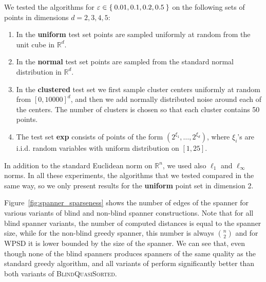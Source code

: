 \documentclass{ws-ijcga}
\newcommand{\eps}{\varepsilon}
\newcommand{\RR}{\mathbb{R}}
\begin{document}

We tested the algorithms for $\eps \in \Set{0.01, 0.1, 0.2, 0.5}$ on the following sets of points in dimensions $d = 2,3,4,5$:
\begin{enumerate}
    \item In the \textbf{uniform} test set points are sampled uniformly at
        random from the unit cube in $\mathbb{R}^d$.
    \item In the \textbf{normal} test set points are sampled from the standard
        normal distribution in $\mathbb{R}^d$.
    \item In the \textbf{clustered} test set we first sample cluster centers uniformly 
        at random from $[0,10000]^d$, and then we add normally distributed noise around
        each of the centers. The number of clusters is chosen so that each cluster
        contains 50 points.
    \item The test set \textbf{exp} consists of points of the form $(2^{\xi_1}, \dots, 2^{\xi_d})$,
        where $\xi_i$'s are i.i.d. random variables with uniform distribution on $[1,25]$.
\end{enumerate}
In addition to the standard Euclidean norm on $\RR^n$, we used also $\ell_1$ and $\ell_\infty$ norms.
In all these experiments, the algorithms that we tested compared in the same way,
so we only present results for the \textbf{uniform} point set in dimension 2.



Figure~\ref{fig:spanner_sparseness}
shows the number of edges of the spanner for various variants of 
blind and non-blind spanner constructions.
Note that for all blind spanner variants, the number of computed distances
is equal to the spanner size, while for the non-blind greedy spanner,
this number is always $\binom{n}{2}$ and for WPSD it is lower bounded
by the size of the spanner.
We can see that, even though none of the blind spanners produces
spanners of the same quality as the standard greedy algorithm,
\bgrdy and all variants of \brndm
perform significantly better than both variants of \textsc{BlindQuasiSorted}.
\end{document}

